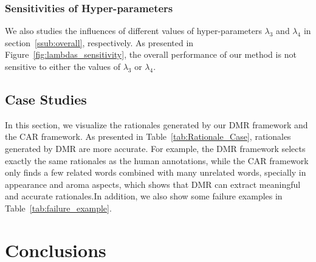 \documentclass[letterpaper]{article} %
\begin{document}
\subsubsection{Sensitivities of Hyper-parameters}
We also studies the influences of different values of hyper-parameters $\lambda_3$ and $\lambda_4$ in section~\ref{ssub:overall}, respectively. 
As presented in Figure~\ref{fig:lambdas_sensitivity}, the overall performance of our method is not sensitive to either the values of $\lambda_3$ or $\lambda_4$. 
\subsection{Case Studies}
In this section, we visualize the rationales generated by our DMR framework and the CAR framework.
As presented in Table~\ref{tab:Rationale_Case}, rationales generated by DMR are more accurate. For example, the DMR framework selects exactly the same rationales as the human annotations, while the CAR framework only finds a few related words combined with many unrelated words, specially in appearance and aroma aspects, which shows that DMR can extract meaningful and accurate rationales.In addition, we also show some failure examples in Table~\ref{tab:failure_example}.
\section{Conclusions}
\end{document}
